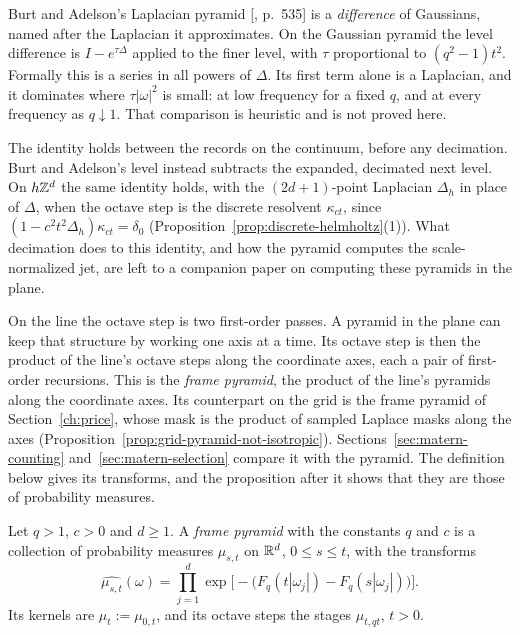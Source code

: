 Burt and Adelson's Laplacian pyramid [, p.~535] is a \emph{difference} of
Gaussians, named
after the Laplacian it approximates. On the Gaussian pyramid the level difference is
$I - e^{\tau\Delta}$ applied to the finer level, with $\tau$ proportional to $(q^2 - 1)t^2$.
Formally this is a series in all powers of $\Delta$. Its first term alone is a Laplacian, and it
dominates where $\tau|\omega|^2$ is small: at low frequency for a fixed $q$, and at every frequency
as $q \downarrow 1$. That comparison is heuristic and is not proved here.

The identity holds between the records on the continuum, before any decimation. Burt and Adelson's
level instead subtracts the expanded, decimated next level. On $h\mathbb{Z}^d$ the same identity holds,
with the $(2d+1)$-point Laplacian $\Delta_h$ in place of $\Delta$, when the octave step is the
discrete resolvent $\kappa_{ct}$, since $(1 - c^2t^2\Delta_h)\kappa_{ct} = \delta_0$
(Proposition~\ref{prop:discrete-helmholtz}(1)).
What decimation does to this identity, and how the pyramid computes the scale-normalized jet, are
left to a companion paper on computing these pyramids in the plane.

On the line the octave step is two first-order passes. A pyramid in the plane can keep that
structure by working one axis at a time. Its octave step is then the product of the line's octave
steps along the coordinate axes, each a pair of first-order recursions. This is the \emph{frame
\Matern{} pyramid}, the product of the line's \Matern{} pyramids along the coordinate axes. Its
counterpart on the grid is the frame pyramid of Section~\ref{ch:price}, whose mask is the product
of sampled Laplace masks along the axes (Proposition~\ref{prop:grid-pyramid-not-isotropic}).
Sections~\ref{sec:matern-counting} and~\ref{sec:matern-selection} compare it with the \Matern{}
pyramid. The definition below gives its transforms, and the proposition after it shows that they
are those of probability measures.

\begin{definition}
\label{def:frame-matern-pyramid}

Let $q > 1$, $c > 0$ and $d \ge 1$. A \emph{frame \Matern{} pyramid} with the constants $q$ and $c$
is a collection of probability measures $\mu_{s,t}$ on $\mathbb{R}^d$, $0 \le s \le t$, with the transforms
\[
  \widehat{\mu_{s,t}}(\omega)
   = \prod_{j=1}^d\exp\bigl[-\bigl(F_q(t|\omega_j|) - F_q(s|\omega_j|)\bigr)\bigr] .
\]
Its kernels are $\mu_t := \mu_{0,t}$, and its octave steps the stages $\mu_{t,qt}$, $t > 0$.
\end{definition}

